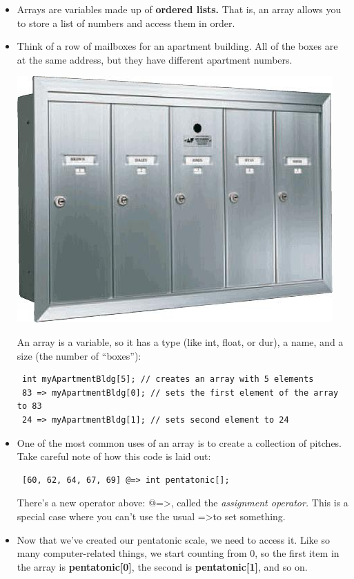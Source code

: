 \documentclass{article}
\begin{document}
\begin{itemize}

\item Arrays are variables made up of \textbf{ordered lists.} That is, an array allows you to store a list of numbers and access them in order.

\item Think of a row of mailboxes for an apartment building. All of the boxes are at the same address, but they have different apartment numbers.

\includegraphics[scale=0.3]{apt_boxes}

An array is a variable, so it has a type (like int, float, or dur), a name, and a size (the number of ``boxes''):

\begin{lstlisting}
 int myApartmentBldg[5]; // creates an array with 5 elements
 83 => myApartmentBldg[0]; // sets the first element of the array to 83
 24 => myApartmentBldg[1]; // sets second element to 24
\end{lstlisting}

\item One of the most common uses of an array is to create a collection of pitches. Take careful note of how this code is laid out:

\begin{lstlisting}
 [60, 62, 64, 67, 69] @=> int pentatonic[];
\end{lstlisting}

There's a new operator above: @=\textgreater, called the \textsl{assignment operator.} This is a special case where you can't use the usual =\textgreater to set something.
\pagebreak
\item Now that we've created our pentatonic scale, we need to access it. Like so many computer-related things, we start counting from 0, so the first item in the array is \textbf{pentatonic[0]}, the second is \textbf{pentatonic[1]}, and so on.


\end{itemize}
\end{document}
